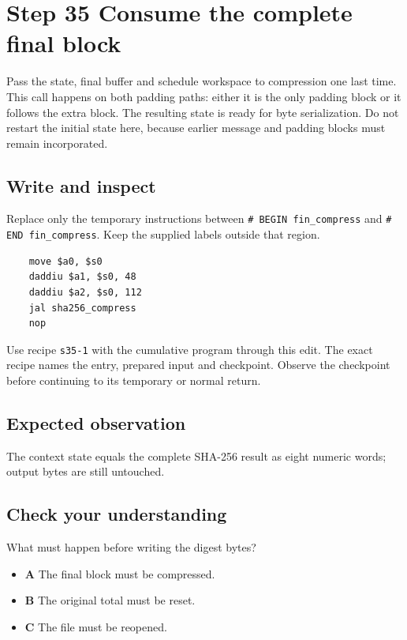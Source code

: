 \section{Step 35 Consume the complete final block}\label{sha-s35}

Pass the state, final buffer and schedule workspace to compression one last time. This call happens on both padding paths: either it is the only padding block or it follows the extra block. The resulting state is ready for byte serialization. Do not restart the initial state here, because earlier message and padding blocks must remain incorporated.

\subsection{Write and inspect}
Replace only the temporary instructions between \texttt{\# BEGIN fin\_compress} and \texttt{\# END fin\_compress}. Keep the supplied labels outside that region.

\begin{verbatim}
    move $a0, $s0
    daddiu $a1, $s0, 48
    daddiu $a2, $s0, 112
    jal sha256_compress
    nop
\end{verbatim}

Use recipe \texttt{s35-1} with the cumulative program through this edit. The exact recipe names the entry, prepared input and checkpoint. Observe the checkpoint before continuing to its temporary or normal return.

\subsection{Expected observation}
The context state equals the complete SHA-256 result as eight numeric words; output bytes are still untouched.

\subsection{Check your understanding}
What must happen before writing the digest bytes?

\begin{itemize}
\item \textbf{A} The final block must be compressed.
\item \textbf{B} The original total must be reset.
\item \textbf{C} The file must be reopened.
\end{itemize}
